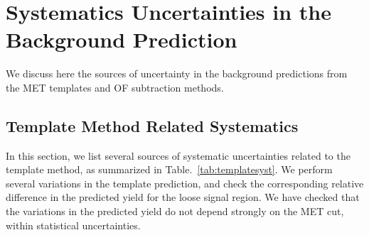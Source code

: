 \section{Systematics Uncertainties in the Background Prediction}
\label{sec:systematics}

We discuss here the sources of uncertainty in the background predictions from the MET templates and OF subtraction methods.

\subsection{Template Method Related Systematics}
In this section, we list several sources of systematic uncertainties related to the template method,
as summarized in Table.~\ref{tab:templatesyst}. We perform several variations in the template prediction,
and check the corresponding relative difference in the predicted yield for the loose signal region.
We have checked that the variations in the predicted yield do not depend strongly on the MET cut,
within statistical uncertainties. 

